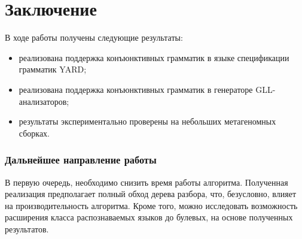 \section*{Заключение}
В ходе работы получены следующие результаты:
\begin{itemize}
    \item реализована поддержка конъюнктивных грамматик в языке спецификации грамматик YARD;
    \item реализована поддержка конъюнктивных грамматик в генераторе GLL-анализаторов;
    \item результаты экспериментально проверены на небольших метагеномных сборках.
\end{itemize}

\subsubsection*{Дальнейшее направление работы}

В первую очередь, необходимо снизить время работы алгоритма. Полученная реализация предполагает полный обход дерева разбора, что, безусловно, влияет на производительность алгоритма. Кроме того, можно исследовать возможность расширения класса распознаваемых языков до булевых, на основе полученных результатов.

